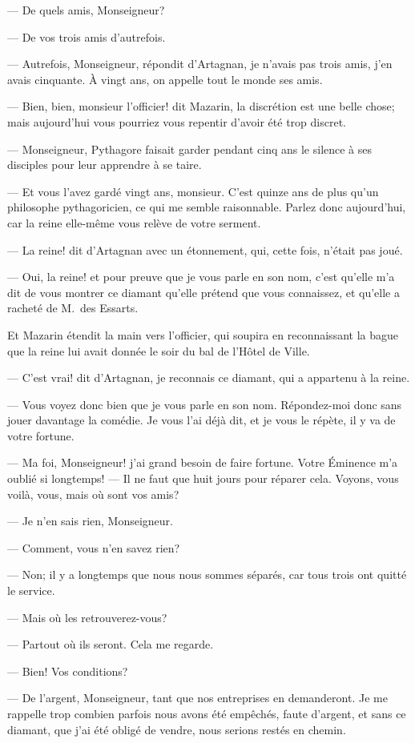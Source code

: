 — De quels amis, Monseigneur?

— De vos trois amis d'autrefois.

— Autrefois, Monseigneur, répondit d'Artagnan, je n'avais pas trois amis, j'en avais cinquante. À vingt ans, on appelle tout le monde ses amis.

— Bien, bien, monsieur l'officier! dit Mazarin, la discrétion est une belle chose; mais aujourd'hui vous pourriez vous repentir d'avoir été trop discret.

— Monseigneur, Pythagore faisait garder pendant cinq ans le silence à ses disciples pour leur apprendre à se taire.

— Et vous l'avez gardé vingt ans, monsieur. C'est quinze ans de plus qu'un philosophe pythagoricien, ce qui me semble raisonnable. Parlez donc aujourd'hui, car la reine elle-même vous relève de votre serment.

— La reine! dit d'Artagnan avec un étonnement, qui, cette fois, n'était pas joué.

— Oui, la reine! et pour preuve que je vous parle en son nom, c'est qu'elle m'a dit de vous montrer ce diamant qu'elle prétend que vous connaissez, et qu'elle a racheté de M.~des Essarts.

Et Mazarin étendit la main vers l'officier, qui soupira en reconnaissant la bague que la reine lui avait donnée le soir du bal de l'Hôtel de Ville.

— C'est vrai! dit d'Artagnan, je reconnais ce diamant, qui a appartenu à la reine.

— Vous voyez donc bien que je vous parle en son nom. Répondez-moi donc sans jouer davantage la comédie. Je vous l'ai déjà dit, et je vous le répète, il y va de votre fortune.

— Ma foi, Monseigneur! j'ai grand besoin de faire fortune. Votre Éminence m'a oublié si longtemps!
— Il ne faut que huit jours pour réparer cela. Voyons, vous voilà, vous, mais où sont vos amis?

— Je n'en sais rien, Monseigneur.

— Comment, vous n'en savez rien?

— Non; il y a longtemps que nous nous sommes séparés, car tous trois ont quitté le service.

— Mais où les retrouverez-vous?

— Partout où ils seront. Cela me regarde.

— Bien! Vos conditions?

— De l'argent, Monseigneur, tant que nos entreprises en demanderont. Je me rappelle trop combien parfois nous avons été empêchés, faute d'argent, et sans ce diamant, que j'ai été obligé de vendre, nous serions restés en chemin.

